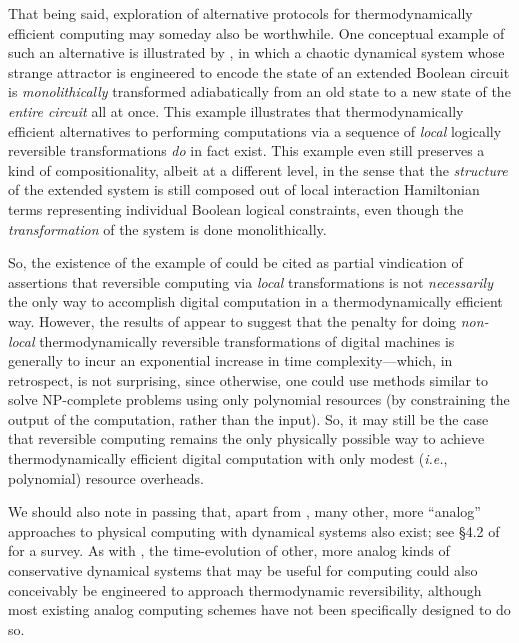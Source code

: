 \documentclass[preprints,article,accept,moreauthors,pdftex]{Definitions/mdpi}
\begin{document}
\begin{paracol}{2}
That being said, exploration of alternative protocols for thermodynamically efficient computing may someday also be worthwhile. One conceptual example of such an alternative is illustrated by \cite{FD16}, in which a chaotic dynamical system whose strange attractor is engineered to encode the state of an extended Boolean circuit is \textit{monolithically} transformed adiabatically from an old state to a new state of the \textit{entire circuit} all at once. This example illustrates that thermodynamically efficient alternatives to performing computations via a sequence of \textit{local} logically reversible transformations \textit{do} in fact exist. This example even still preserves a kind of compositionality, albeit at a different level, in the sense that the \textit{structure} of the extended system is still composed out of local interaction Hamiltonian terms representing individual Boolean logical constraints, even though the \textit{transformation} of the system is done monolithically.

So, the existence of the example of \cite{FD16} could be cited as partial vindication of assertions %
that reversible computing via \textit{local} transformations is not \textit{necessarily} the only way to accomplish digital computation in a thermodynamically efficient way. However, the results of \cite{FD16} appear to suggest that the penalty for doing \textit{non-local} thermodynamically reversible transformations of digital machines is generally to incur an exponential increase in time complexity---which, in retrospect, is not surprising, since otherwise, one could use methods similar \cite{FD16} to solve NP-complete problems using only polynomial resources (by constraining the output of the computation, rather than the input). So, it may still be the case that reversible computing remains the only physically possible way to achieve thermodynamically efficient digital computation with only modest (\textit{i.e.}, polynomial) resource overheads.

We should also note in passing that, apart from \cite{FD16}, many other, more ``analog'' approaches to physical computing with dynamical systems also exist; see \S4.2 of \cite{BC20} for a survey. As with \cite{FD16}, the time-evolution of other, more analog kinds of conservative dynamical systems that may be useful for computing could also conceivably be engineered to approach thermodynamic reversibility, although most existing analog computing schemes have not been specifically designed to do so.


\end{paracol}
\end{document}
